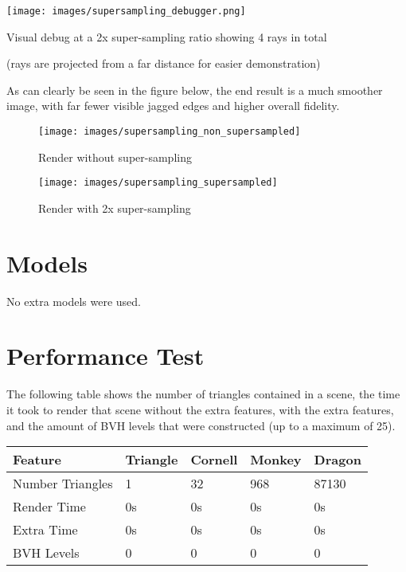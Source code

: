 \documentclass{article}
\begin{document}
    \begin{center}
        \texttt{[image: images/supersampling\_debugger.png]}

        {\footnotesize Visual debug at a 2x super-sampling ratio showing 4 rays in total
        
        (rays are projected from a far distance for easier demonstration)\par}
    \end{center}
    As can clearly be seen in the figure below, the end result is a much smoother image, with far fewer 
    visible jagged edges and higher overall fidelity.

    \begin{figure}[!htb]
          \texttt{[image: images/supersampling\_non\_supersampled]}
          \caption*{Render without super-sampling}
        \endminipage\hfill
          \texttt{[image: images/supersampling\_supersampled]}
          \caption*{Render with 2x super-sampling}
        \endminipage
    \end{figure}

    \section{Models}
    No extra models were used.

    \section{Performance Test}
    The following table shows the number of triangles contained in a scene, the time it took to render that 
    scene without the extra features, with the extra features, and the amount of BVH levels that were 
    constructed (up to a maximum of 25).

    \begin{tabular}{ |p{2.8cm}||p{1.5cm}|p{1.5cm}|p{1.5cm}|p{1.5cm}| }
      \hline
      \textbf{Feature} &\textbf{Triangle} &\textbf{Cornell} &\textbf{Monkey} &\textbf{Dragon}\\
      \hline
      Number Triangles  &1      &32     &968    &87130\\
      Render Time       &0s     &0s     &0s     &0s\\
      Extra Time        &0s     &0s     &0s     &0s\\
      BVH Levels        &0      &0      &0      &0\\
      \hline
  \end{tabular}
\end{document}
